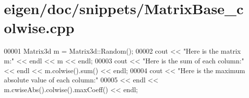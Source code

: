 \hypertarget{eigen_2doc_2snippets_2_matrix_base__colwise_8cpp_source}{}\section{eigen/doc/snippets/\+Matrix\+Base\+\_\+colwise.cpp}
\label{eigen_2doc_2snippets_2_matrix_base__colwise_8cpp_source}

\begin{DoxyCode}
00001 Matrix3d m = Matrix3d::Random();
00002 cout << \textcolor{stringliteral}{"Here is the matrix m:"} << endl << m << endl;
00003 cout << \textcolor{stringliteral}{"Here is the sum of each column:"} << endl << m.colwise().sum() << endl;
00004 cout << \textcolor{stringliteral}{"Here is the maximum absolute value of each column:"}
00005      << endl << m.cwiseAbs().colwise().maxCoeff() << endl;
\end{DoxyCode}

